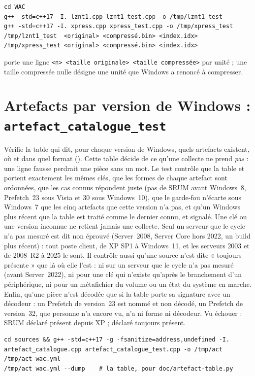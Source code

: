 \documentclass[11pt,a4paper,oneside]{report}
\begin{document}
\begin{lstlisting}
cd WAC
g++ -std=c++17 -I. lznt1.cpp lznt1_test.cpp -o /tmp/lznt1_test
g++ -std=c++17 -I. xpress.cpp xpress_test.cpp -o /tmp/xpress_test
/tmp/lznt1_test  <original> <compressé.bin> <index.idx>
/tmp/xpress_test <original> <compressé.bin> <index.idx>
\end{lstlisting}

 porte une ligne \texttt{<n> <taille originale> <taille
compressée>} par unité ; une taille compressée nulle désigne une unité que
Windows a renoncé à compresser.

\section{Artefacts par version de Windows : \texttt{artefact\_catalogue\_test}}

Vérifie la table qui dit, pour chaque version de Windows, quels artefacts
existent, où et dans quel format (). Cette table
décide de ce qu'une collecte ne prend \emph{pas} : une ligne fausse perdrait une
pièce sans un mot. Le test contrôle que la table et  portent
exactement les mêmes clés, que les formes de chaque artefact sont ordonnées, que
les cas connus répondent juste (pas de SRUM avant Windows~8, Prefetch~23 sous
Vista et 30 sous Windows~10), que le garde-fou n'écarte sous Windows~7 que les
cinq artefacts que cette version n'a pas, et qu'un Windows plus récent que la
table est traité comme le dernier connu, et signalé. Une clé ou une version
inconnue ne retient jamais une collecte. Seul un serveur que le cycle n'a pas
mesuré est dit non éprouvé (Server~2008, Server Core hors 2022, un build plus
récent) : tout poste client, de XP SP1 à Windows~11, et les serveurs 2003 et
de 2008~R2 à 2025 le sont. Il contrôle aussi qu'une source n'est
dite « toujours présente » que là où elle l'est : ni sur un serveur que le cycle n'a pas mesuré (avant Server~2022), ni pour
une clé qui n'existe qu'après le branchement d'un périphérique, ni pour un
métafichier du volume ou un état du système en marche. Enfin, qu'une pièce
n'est décodée que si la table porte sa signature avec un décodeur : un Prefetch
de version~23 est nommé et non décodé, un Prefetch de version~32, que personne
n'a encore vu, n'a ni forme ni décodeur. Vu échouer : SRUM
déclaré présent depuis XP ;  déclaré toujours présent.

\begin{lstlisting}
cd sources && g++ -std=c++17 -g -fsanitize=address,undefined -I. artefact_catalogue.cpp artefact_catalogue_test.cpp -o /tmp/act
/tmp/act wac.yml
/tmp/act wac.yml --dump    # la table, pour doc/artefact-table.py
\end{lstlisting}
\end{document}
